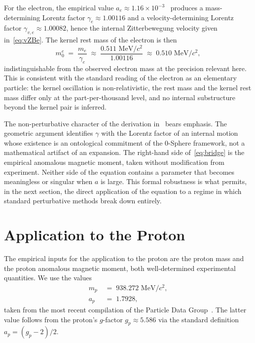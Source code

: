 \documentclass[%
 reprint, amsmath,amssymb, aps, prc, ]{revtex4-2}
\numberwithin{equation}{section}
\begin{document}
For the electron, the empirical value $a_e \approx 1.16 \times 10^{-3}$~\cite{PDG} produces a mass-determining Lorentz factor $\gamma_e \approx 1.00116$ and a velocity-determining Lorentz factor $\gamma_{v,e} \approx 1.00082$, hence the internal Zitterbewegung velocity given in~\eqref{eq:vZBe}.
The kernel rest mass of the electron is then
\begin{equation}
m_{0}^{e} \;=\; \frac{m_e}{\gamma_e} \;\approx\; \frac{0.511 \text{ MeV}/c^2}{1.00116} \;\approx\; 0.510 \text{ MeV}/c^2,
\label{eq:m0e}
\end{equation}
indistinguishable from the observed electron mass at the precision relevant here.
This is consistent with the standard reading of the electron as an elementary particle: the kernel oscillation is non-relativistic, the rest mass and the kernel rest mass differ only at the part-per-thousand level, and no internal substructure beyond the kernel pair is inferred.

The non-perturbative character of the derivation in~\cite{Hanamura10} bears emphasis.
The geometric argument identifies $\gamma$ with the Lorentz factor of an internal motion whose existence is an ontological commitment of the 0-Sphere framework, not a mathematical artifact of an expansion.
The right-hand side of~\eqref{eq:bridge} is the empirical anomalous magnetic moment, taken without modification from experiment.
Neither side of the equation contains a parameter that becomes meaningless or singular when $a$ is large.
This formal robustness is what permits, in the next section, the direct application of the equation to a regime in which standard perturbative methods break down entirely.

\section{Application to the Proton}
\label{sec:proton}

The empirical inputs for the application to the proton are the proton mass and the proton anomalous magnetic moment, both well-determined experimental quantities.
We use the values
\begin{align}
m_p &\;=\; 938.272 \text{ MeV}/c^2,\label{eq:mp}\\
a_p &\;=\; 1.7928,\label{eq:ap}
\end{align}
taken from the most recent compilation of the Particle Data Group~\cite{PDG}.
The latter value follows from the proton's $g$-factor $g_p \approx 5.586$ via the standard definition $a_p = (g_p - 2)/2$.
\end{document}
